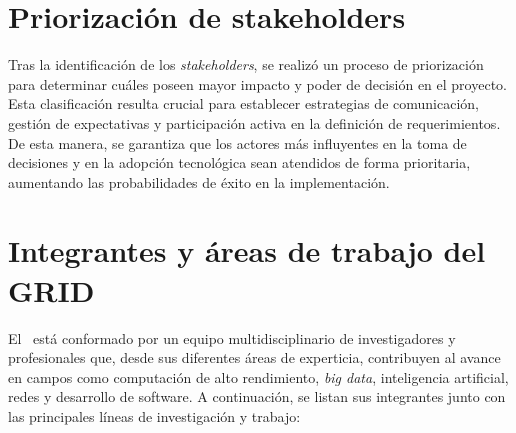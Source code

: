 \section{Priorización de stakeholders}
Tras la identificación de los \textit{stakeholders}, se realizó un proceso de priorización para determinar cuáles poseen mayor impacto y poder de decisión en el proyecto. Esta clasificación resulta crucial para establecer estrategias de comunicación, gestión de expectativas y participación activa en la definición de requerimientos. De esta manera, se garantiza que los actores más influyentes en la toma de decisiones y en la adopción tecnológica sean atendidos de forma prioritaria, aumentando las probabilidades de éxito en la implementación.  



\section{Integrantes y áreas de trabajo del GRID}
El \GRID\ está conformado por un equipo multidisciplinario de investigadores y profesionales que, desde sus diferentes áreas de experticia, contribuyen al avance en campos como computación de alto rendimiento, \textit{big data}, inteligencia artificial, redes y desarrollo de software. A continuación, se listan sus integrantes junto con las principales líneas de investigación y trabajo:  

